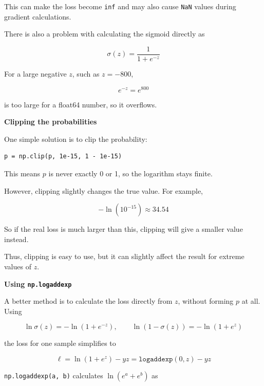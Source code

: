 \documentclass[12pt,a4paper]{article}
\begin{document}
This can make the loss become \texttt{inf} and may also cause \texttt{NaN} values during gradient
calculations.

There is also a problem with calculating the sigmoid directly as

\begin{equation*}
\sigma(z)=\frac{1}{1+e^{-z}}
\end{equation*}

For a large negative $z$, such as $z=-800$,

\begin{equation*}
e^{-z}=e^{800}
\end{equation*}

is too large for a float64 number, so it overflows.

\textbf{Clipping the probabilities}

One simple solution is to clip the probability:

\begin{lstlisting}[style=plainout]
p = np.clip(p, 1e-15, 1 - 1e-15)
\end{lstlisting}

This means $p$ is never exactly 0 or 1, so the logarithm stays finite.

However, clipping slightly changes the true value. For example,

\begin{equation*}
-\ln(10^{-15}) \approx 34.54
\end{equation*}

So if the real loss is much larger than this, clipping will give a smaller value instead.

Thus, clipping is easy to use, but it can slightly affect the result for extreme values of $z$.

\textbf{Using \texttt{np.logaddexp}}

A better method is to calculate the loss directly from $z$, without forming $p$ at all. Using

\begin{equation*}
\ln\sigma(z)=-\ln(1+e^{-z}), \qquad \ln(1-\sigma(z))=-\ln(1+e^{z})
\end{equation*}

the loss for one sample simplifies to

\begin{equation}
\ell = \ln(1+e^{z}) - yz = \texttt{logaddexp}(0, z) - yz
\label{eq:logaddexp}
\end{equation}

\texttt{np.logaddexp(a, b)} calculates $\ln(e^a + e^b)$ as
\end{document}

